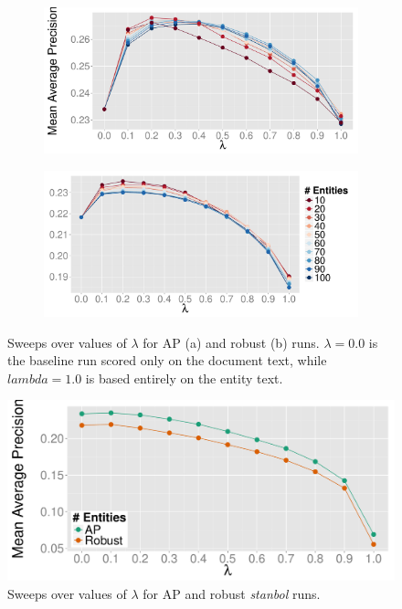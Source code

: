 \documentclass{sig-alternate}
\begin{document}
\begin{figure}
\centering
\begin{subfigure}{\columnwidth}
\centering
\includegraphics[width=\columnwidth]{figures/sweep-entities-AP.pdf}
\end{subfigure}%
\begin{subfigure}{\columnwidth}
\centering
\includegraphics[width=\columnwidth]{figures/sweep-entities-robust.pdf}
\end{subfigure}
\caption{Sweeps over values of $\lambda$ for AP (a) and robust (b) runs. $\lambda=0.0$ is the baseline run scored only on the document text, while $lambda=1.0$ is based entirely on the entity text.}
\label{figure.sweeps-ql}
\end{figure}

\begin{figure}
\centering
\includegraphics[width=.85\columnwidth]{figures/sweep-stanbol.pdf}
\caption{Sweeps over values of $\lambda$ for AP and robust \textit{stanbol} runs.}
\label{figure.sweeps-stanbol}
\end{figure}
\end{document}
